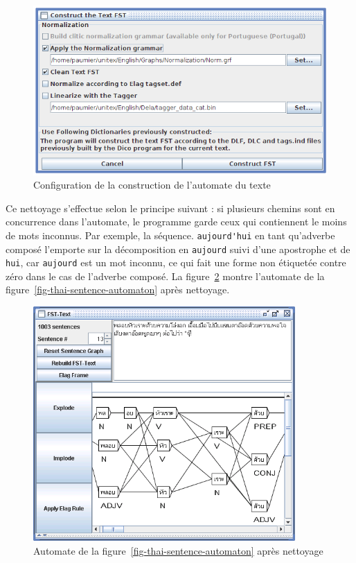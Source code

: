 \begin{figure}[!ht]
\begin{center}
\includegraphics[width=14cm]{resources/img/fig7-10.png}
\caption{Configuration de la construction de l’automate du texte
\label{fig-Txt2Tfst-configuration}}
\end{center}
\end{figure}

\bigskip
\noindent Ce nettoyage s’effectue selon le principe suivant : si plusieurs chemins sont en
concurrence dans l’automate, le programme garde ceux qui contiennent le moins de mots inconnus. Par
exemple, la séquence. \verb+aujourd'hui+ en tant qu’adverbe composé l’emporte sur la décomposition
en \verb+aujourd+ suivi d’une apostrophe et de \verb+hui+, car \verb+aujourd+ est un mot inconnu,
ce qui fait une forme non étiquetée contre zéro dans le cas de l’adverbe composé. La
figure~\ref{fig-clean-thai-sentence-automaton} montre l’automate de la
figure~\ref{fig-thai-sentence-automaton} après nettoyage.

\begin{figure}[!ht]
\begin{center}
\includegraphics[width=10cm]{resources/img/fig7-11.png}
\caption{Automate de la figure~\ref{fig-thai-sentence-automaton} après nettoyage\label{fig-clean-thai-sentence-automaton}}
\end{center}
\end{figure}

